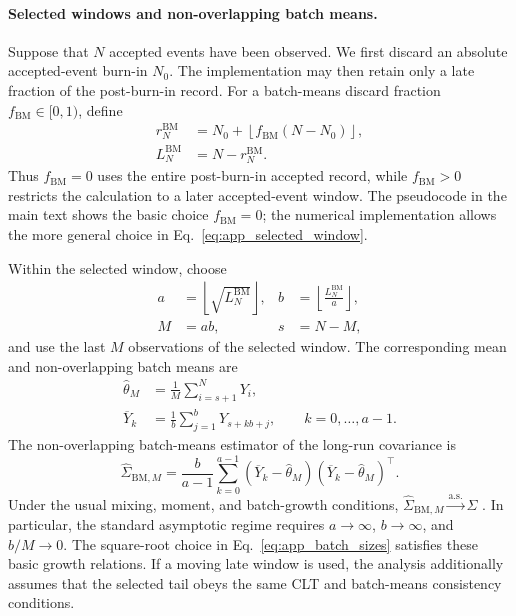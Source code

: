 \documentclass[showpacs,amsmath,amssymb,twocolumn,prx,superscriptaddress,10pt,aps,nofootinbib]{revtex4-2}
\begin{document}
\paragraph{Selected windows and non-overlapping batch means.}
Suppose that $N$ accepted events have been observed. We first discard an absolute accepted-event burn-in $N_0$. The implementation may then retain only a late fraction of the post-burn-in record. For a batch-means discard fraction $f_{\mathrm{BM}}\in[0,1)$, define
\begin{equation}
\label{eq:app_selected_window}
\begin{aligned}
    r_N^{\mathrm{BM}}
    &=
    N_0+
    \left\lfloor
        f_{\mathrm{BM}}(N-N_0)
    \right\rfloor,\\
    L_N^{\mathrm{BM}}
    &=
    N-r_N^{\mathrm{BM}}.
\end{aligned}
\end{equation}
Thus $f_{\mathrm{BM}}=0$ uses the entire post-burn-in accepted record, while $f_{\mathrm{BM}}>0$ restricts the calculation to a later accepted-event window. The pseudocode in the main text shows the basic choice $f_{\mathrm{BM}}=0$; the numerical implementation allows the more general choice in Eq.~\eqref{eq:app_selected_window}.

Within the selected window, choose
\begin{equation}
\label{eq:app_batch_sizes}
\begin{aligned}
    a
    &=
    \left\lfloor\sqrt{L_N^{\mathrm{BM}}}\right\rfloor,
    &
    b
    &=
    \left\lfloor\frac{L_N^{\mathrm{BM}}}{a}\right\rfloor,\\
    M
    &=ab,
    &
    s
    &=N-M,
\end{aligned}
\end{equation}
and use the last $M$ observations of the selected window. The corresponding mean and non-overlapping batch means are
\begin{equation}
\label{eq:app_theta_and_batch_means}
\begin{aligned}
    \widehat\theta_M
    &=
    \frac{1}{M}
    \sum_{i=s+1}^{N}Y_i,\\
    \overline Y_k
    &=
    \frac{1}{b}
    \sum_{j=1}^{b}Y_{s+kb+j},
    \qquad k=0,\ldots,a-1.
\end{aligned}
\end{equation}
The non-overlapping batch-means estimator of the long-run covariance is
\begin{equation}
\label{eq:app_batch_means_covariance}
    \widehat\Sigma_{\mathrm{BM},M}
    =
    \frac{b}{a-1}
    \sum_{k=0}^{a-1}
    (\overline Y_k-\widehat\theta_M)
    (\overline Y_k-\widehat\theta_M)^\top.
\end{equation}
Under the usual mixing, moment, and batch-growth conditions, $\widehat\Sigma_{\mathrm{BM},M}\xrightarrow{\mathrm{a.s.}}\Sigma$ \cite{flegal2010batch,vats2019multivariate}. In particular, the standard asymptotic regime requires $a\to\infty$, $b\to\infty$, and $b/M\to0$. The square-root choice in Eq.~\eqref{eq:app_batch_sizes} satisfies these basic growth relations. If a moving late window is used, the analysis additionally assumes that the selected tail obeys the same
CLT and batch-means consistency conditions.
\end{document}
